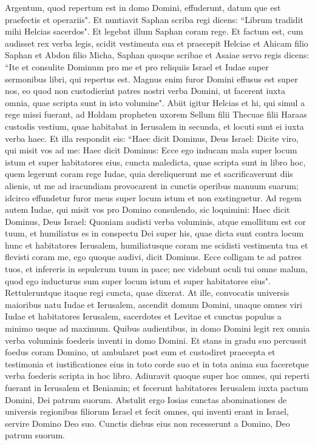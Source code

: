 \begin{biblechapter}
\verse Argentum, quod repertum est in domo Domini, effuderunt, datum que est praefectis et operariis". 
\verse Et nuntiavit Saphan scriba regi dicens: “Librum tradidit mihi Helcias sacerdos". Et legebat illum Saphan coram rege. 
\verse Et factum est, cum audisset rex verba legis, scidit vestimenta sua 
\verse et praecepit Helciae et Ahicam filio Saphan et Abdon filio Micha, Saphan quoque scribae et Asaiae servo regis dicens: 
\verse “Ite et consulite Dominum pro me et pro reliquiis Israel et Iudae super sermonibus libri, qui repertus est. Magnus enim furor Domini effusus est super nos, eo quod non custodierint patres nostri verba Domini, ut facerent iuxta omnia, quae scripta sunt in isto volumine". 
\verse Abiit igitur Helcias et hi, qui simul a rege missi fuerant, ad Holdam propheten uxorem Sellum filii Thecuae filii Haraas custodis vestium, quae habitabat in Ierusalem in secunda, et locuti sunt ei iuxta verba haec. 
\verse Et illa respondit eis: “Haec dicit Dominus, Deus Israel: Dicite viro, qui misit vos ad me: 
\verse Haec dicit Dominus: Ecce ego inducam mala super locum istum et super habitatores eius, cuncta maledicta, quae scripta sunt in libro hoc, quem legerunt coram rege Iudae, 
\verse quia dereliquerunt me et sacrificaverunt diis alienis, ut me ad iracundiam provocarent in cunctis operibus manuum suarum; idcirco effundetur furor meus super locum istum et non exstinguetur. 
\verse Ad regem autem Iudae, qui misit vos pro Domino consulendo, sic loquimini: Haec dicit Dominus, Deus Israel: Quoniam audisti verba voluminis, 
\verse atque emollitum est cor tuum, et humiliatus es in conspectu Dei super his, quae dicta sunt contra locum hunc et habitatores Ierusalem, humiliatusque coram me scidisti vestimenta tua et flevisti coram me, ego quoque audivi, dicit Dominus. 
\verse Ecce colligam te ad patres tuos, et infereris in sepulcrum tuum in pace; nec videbunt oculi tui omne malum, quod ego inducturus sum super locum istum et super habitatores eius". Rettuleruntque itaque regi cuncta, quae dixerat. 
\verse At ille, convocatis universis maioribus natu Iudae et Ierusalem, 
\verse ascendit domum Domini, unaque omnes viri Iudae et habitatores Ierusalem, sacerdotes et Levitae et cunctus populus a minimo usque ad maximum. Quibus audientibus, in domo Domini legit rex omnia verba voluminis foederis inventi in domo Domini. 
\verse Et stans in gradu suo percussit foedus coram Domino, ut ambularet post eum et custodiret praecepta et testimonia et iustificationes eius in toto corde suo et in tota anima sua faceretque verba foederis scripta in hoc libro. 
\verse Adiuravit quoque super hoc omnes, qui reperti fuerant in Ierusalem et Beniamin; et fecerunt habitatores Ierusalem iuxta pactum Domini, Dei patrum suorum. 
\verse Abstulit ergo Iosias cunctas abominationes de universis regionibus filiorum Israel et fecit omnes, qui inventi erant in Israel, servire Domino Deo suo. Cunctis diebus eius non recesserunt a Domino, Deo patrum suorum. 
\end{biblechapter}

